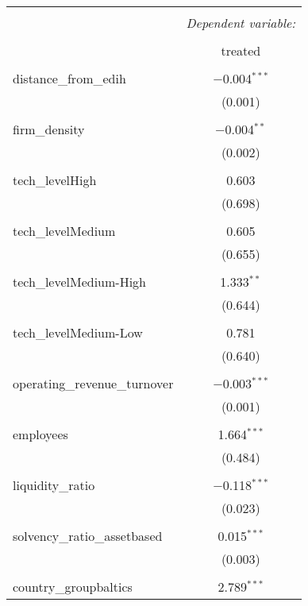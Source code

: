 
\begin{table}[!htbp] \centering 
  \caption{} 
  \label{} 
\begin{tabular}{@{\extracolsep{5pt}}lc} 
\\[-1.8ex]\hline 
\hline \\[-1.8ex] 
 & \multicolumn{1}{c}{\textit{Dependent variable:}} \\ 
\cline{2-2} 
\\[-1.8ex] & treated \\ 
\hline \\[-1.8ex] 
 distance\_from\_edih & $-$0.004$^{***}$ \\ 
  & (0.001) \\ 
  & \\ 
 firm\_density & $-$0.004$^{**}$ \\ 
  & (0.002) \\ 
  & \\ 
 tech\_levelHigh & 0.603 \\ 
  & (0.698) \\ 
  & \\ 
 tech\_levelMedium & 0.605 \\ 
  & (0.655) \\ 
  & \\ 
 tech\_levelMedium-High & 1.333$^{**}$ \\ 
  & (0.644) \\ 
  & \\ 
 tech\_levelMedium-Low & 0.781 \\ 
  & (0.640) \\ 
  & \\ 
 operating\_revenue\_turnover & $-$0.003$^{***}$ \\ 
  & (0.001) \\ 
  & \\ 
 employees & 1.664$^{***}$ \\ 
  & (0.484) \\ 
  & \\ 
 liquidity\_ratio & $-$0.118$^{***}$ \\ 
  & (0.023) \\ 
  & \\ 
 solvency\_ratio\_assetbased & 0.015$^{***}$ \\ 
  & (0.003) \\ 
  & \\ 
 country\_groupbaltics & 2.789$^{***}$ \\ 

\end{tabular}
\end{table}
